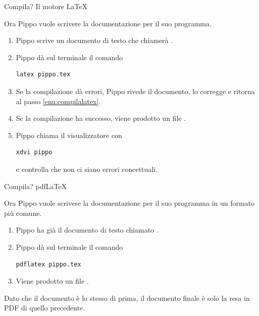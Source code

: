 \documentclass{beamer}
\begin{document}
\begin{frame}[fragile]{Compila? Il motore \LaTeX}

Ora Pippo vuole scrivere la documentazione per il suo programma.
\bigskip
\begin{enumerate}
\item Pippo scrive un documento di testo che chiamer\`a .
\item \label{enu:compilalatex}Pippo d\`a sul terminale il comando

\begin{verbatim}
latex pippo.tex
\end{verbatim}

\item Se la compilazione d\`a errori, Pippo rivede il documento, lo corregge
e ritorna al passo \ref{enu:compilalatex}.
\item Se la compilazione ha successo, viene prodotto un file .
\item Pippo chiama il visualizzatore con

\begin{verbatim}
xdvi pippo
\end{verbatim}

e controlla che non ci siano errori concettuali.
\end{enumerate}
\end{frame}

\begin{frame}[fragile]{Compila? pdf\LaTeX}

Ora Pippo vuole scrivere la documentazione per il suo programma in
un formato pi\`u comune.
\bigskip
\begin{enumerate}
\item Pippo ha gi\`a il documento di testo chiamato .
\item Pippo d\`a sul terminale il comando
\begin{verbatim}
pdflatex pippo.tex
\end{verbatim}
\item Viene prodotto un file .
\end{enumerate}
\bigskip
Dato che il documento  \`e lo stesso di prima,
il documento finale \`e solo la resa in PDF di quello precedente.
\end{frame}
\end{document}
